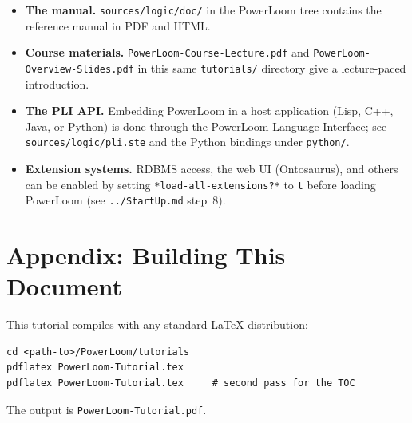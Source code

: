 \documentclass[11pt,letterpaper]{article}
\newcommand{\cmd}[1]{\texttt{#1}}
\newcommand{\file}[1]{\texttt{#1}}
\begin{document}
\begin{itemize}[nosep]
  \item \textbf{The manual.} \file{sources/logic/doc/} in the PowerLoom
        tree contains the reference manual in PDF and HTML.
  \item \textbf{Course materials.} \file{PowerLoom-Course-Lecture.pdf}
        and \file{PowerLoom-Overview-Slides.pdf} in this same
        \file{tutorials/} directory give a lecture-paced introduction.
  \item \textbf{The PLI API.} Embedding PowerLoom in a host application
        (Lisp, C++, Java, or Python) is done through the PowerLoom
        Language Interface; see \file{sources/logic/pli.ste} and the
        Python bindings under \file{python/}.
  \item \textbf{Extension systems.} RDBMS access, the web UI
        (Ontosaurus), and others can be enabled by setting
        \cmd{*load-all-extensions?*} to \cmd{t} before loading
        PowerLoom (see \file{../StartUp.md} step~8).
\end{itemize}

\section*{Appendix: Building This Document}

This tutorial compiles with any standard LaTeX distribution:

\begin{lstlisting}[style=shell]
cd <path-to>/PowerLoom/tutorials
pdflatex PowerLoom-Tutorial.tex
pdflatex PowerLoom-Tutorial.tex     # second pass for the TOC
\end{lstlisting}

\noindent The output is \file{PowerLoom-Tutorial.pdf}.
\end{document}
